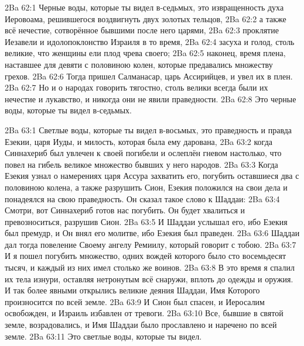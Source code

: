 \vs 2Ba 62:1
Черные воды, которые ты видел в-седьмых, это извращенность духа Иеровоама, решившегося воздвигнуть двух золотых тельцов,
\vs 2Ba 62:2
а также всё нечестие, сотворённое бывшими после него царями,
\vs 2Ba 62:3
проклятие Иезавели и идолопоклонство Израиля в то время,
\vs 2Ba 62:4
засуха и голод, столь великие, что женщины ели плод чрева своего;
\vs 2Ba 62:5
наконец, время плена, наставшее для девяти с половиною колен, которые предавались множеству грехов.
\vs 2Ba 62:6
Тогда пришел Салманасар, царь Ассирийцев, и увел их в плен.
\vs 2Ba 62:7
Но и о народах говорить тягостно, столь велики всегда были их нечестие и лукавство, и никогда они не явили праведности.
\vs 2Ba 62:8
Это черные воды, которые ты видел в-седьмых.

\vs 2Ba 63:1
Светлые воды, которые ты видел в-восьмых, это праведность и правда Езекии, царя Иуды, и милость, которая была ему дарована,
\vs 2Ba 63:2
когда Синнахериб был увлечен к своей погибели и ослеплён гневом настолько, что повел на гибель великое множество бывших у него народов.
\vs 2Ba 63:3
Когда Езекия узнал о намерениях царя Ассура захватить его, погубить оставшиеся два с половиною колена, а также разрушить Сион, Езекия положился на свои дела и понадеялся на свою праведность. Он сказал такое слово к Шаддаи:
\vs 2Ba 63:4
Смотри, вот Синнахериб готов нас погубить. Он будет хвалиться и превозноситься, разрушив Сион.
\vs 2Ba 63:5
И Шаддаи услышал его, ибо Езекия был премудр, и Он внял его молитве, ибо Езекия был праведен.
\vs 2Ba 63:6
Шаддаи дал тогда повеление Своему ангелу Ремиилу, который говорит с тобою.
\vs 2Ba 63:7
И я пошел погубить множество, одних вождей которого было сто восемьдесят тысяч, и каждый из них имел столько же воинов.
\vs 2Ba 63:8
В это время я спалил их тела изнури, оставляя нетронутым всё снаружи, вплоть до одежды и оружия. И так более явными открылись великие деяния Шаддаи, Имя Которого произносится по всей земле.
\vs 2Ba 63:9
И Сион был спасен, и Иеросалим освобожден, и Израиль избавлен от тревоги.
\vs 2Ba 63:10
Все, бывшие в святой земле, возрадовались, и Имя Шаддаи было прославлено и наречено по всей земле.
\vs 2Ba 63:11
Это светлые воды, которые ты видел.

